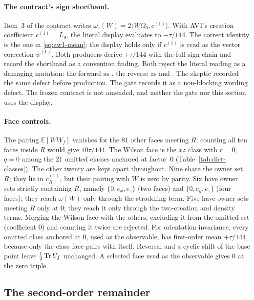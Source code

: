 \paragraph{The contract's sign shorthand.}
Item~3 of the contract writes $\omega_\tau(W)=2\langle W\Omega_0,c^{(1)}\rangle$.
With AV1's creation coefficient $c^{(1)}=L_0$, the literal display evaluates
to $-\tau/144$. The correct identity is the one in \eqref{eq:aw1-mean}; the
display holds only if $c^{(1)}$ is read as the vector correction $\psi^{(1)}$.
Both producers derive $+\tau/144$ with the full sign chain and record the
shorthand as a convention finding. Both reject the literal reading as a
damaging mutation: the forward as
, the reverse as
 and . The skeptic
recorded the same defect before production. The gate records it as a
non-blocking wording defect. The frozen contract is not amended, and neither
the gate nor this section uses the display.

\paragraph{Face controls.}
The pairing $\mathbb E[WW_f]$ vanishes for the 81 other faces meeting $R$;
counting all ten faces inside $R$ would give $10\tau/144$. The Wilson face is
the $xz$ class with $r=0$, $q=0$ among the 21 omitted classes anchored at
factor~$0$ (Table~\ref{tab:dict-classes}). The other twenty are kept apart
throughout. Nine share the owner set $R$; they lie in $c^{(1)}_R$, but
their pairing with $W$ is zero by parity. Six have owner sets strictly
containing $R$, namely $\{0,e_x,e_z\}$ (two faces) and $\{0,e_y,e_z\}$ (four
faces); they reach $\omega(W)$ only through the straddling term. Five have
owner sets meeting $R$ only at $0$; they reach it only through the
two-creation and density terms. Merging the Wilson face with the others,
excluding it from the omitted set (coefficient $0$) and counting it twice are
rejected. For orientation invariance, every omitted class anchored at $0$,
used as the observable, has first-order mean $+\tau/144$, because only the
class face pairs with itself. Reversal and a cyclic shift of the base point
leave $\tfrac12\operatorname{Tr} U_f$ unchanged. A selected face used as the observable
gives $0$ at the zero triple.

\subsection{The second-order remainder}
\label{sec:aw1-k2}
